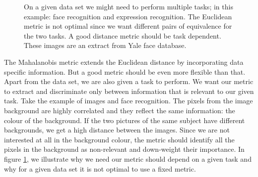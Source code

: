 	\begin{figure}
		 \centering
			    \hspace{0.07\textwidth}
		\caption[Motivating the need for a distance metric --- different tasks are solved by different metrics]{On a given data set we might need to perform multiple tasks; in this example: face recognition and expression recognition. The Euclidean metric is not optimal since we want different pairs of equivalence for the two tasks. A good distance metric should be task dependent. These images are an extract from Yale face database.}
		\label{fig:face-recog-vs-expression-recog}
	\end{figure}

The Mahalanobis metric extends the Euclidean distance by incorporating data specific information. But a good metric should be even more flexible than that. Apart from the data set, we are also given a task to perform. We want our metric to extract and discriminate only between information that is relevant to our given task. Take the example of images and face recognition. The pixels from the image background are highly correlated and they reflect the same information: the colour of the background. If the two pictures of the same subject have different backgrounds, we get a high distance between the images. Since we are not interested at all in
the background colour, the metric should identify all the pixels in the background as non-relevant and down-weight their importance. In figure \ref{fig:face-recog-vs-expression-recog}, we illustrate why we need our metric should depend on a given task and why for a given data set it is not optimal to use a fixed metric.

